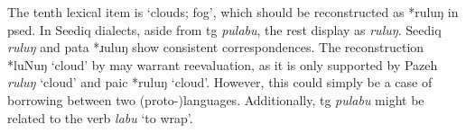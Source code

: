 
The tenth lexical item is `clouds; fog', which should be reconstructed as *ruluŋ in \acl{psed}. In Seediq dialects, aside from \acl{tg} \textit{pulabu}, the rest display as \textit{ruluŋ}. Seediq \textit{ruluŋ} and \acl{pata} *ɹuluŋ show consistent correspondences. The reconstruction *luNuŋ `cloud' by \textcite{ACD} may warrant reevaluation, as it is only supported by Pazeh \textit{ruluŋ} `cloud' and \acl{paic} *ruluŋ `cloud'. However, this could simply be a case of borrowing between two (proto-)languages. Additionally, \acl{tg} \textit{pulabu} might be related to the verb \textit{labu} `to wrap'.



